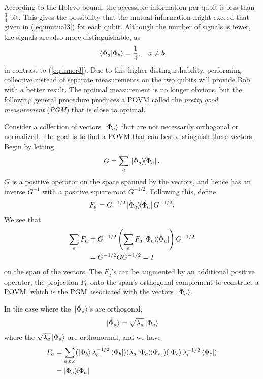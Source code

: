 \documentclass[a4paper, 12pt]{article}
\numberwithin{equation}{section}
\numberwithin{figure}{section}
\theoremstyle{definition}
\begin{document}
    According to the Holevo bound, the accessible information per qubit is less than $\frac{3}{4}$ bit. This gives the possibility that the mutual information might exceed that given in (\ref{eq:mutual3}) for each qubit. Although the number of signals is fewer, the signals are also more distinguishable, as
    \begin{align}
        \braket{\Phi_a}{\Phi_b} = \frac{1}{4}, \quad a \neq b
    \end{align}
    in contrast to (\ref{eq:inner3}). Due to this higher distinguishability, performing collective instead of separate measurements on the two qubits will provide Bob with a better result. The optimal measurement is no longer obvious, but the following general procedure produces a POVM called the \textit{pretty good measurement} (\textit{PGM}) that is close to optimal. \par
    Consider a collection of vectors $\ket*{\tilde{\Phi}_a}$ that are not necessarily orthogonal or normalized. The goal is to find a POVM that can best distinguish these vectors. Begin by letting 
    \begin{align}
        G = \sum_a \dyad*{\tilde{\Phi}_a}{\tilde{\Phi}_a}.
    \end{align}
    $G$ is a positive operator on the space spanned by the vectors, and hence has an inverse $G^{-1}$ with a positive square root $G^{-1/2}$. Following this, define
    \begin{align}
        F_a = G^{-1/2} \dyad*{\tilde{\Phi}_a}{\tilde{\Phi}_a} G^{-1/2}.
    \end{align}
    We see that
    \begin{align}
        \sum_a F_a &= G^{-1/2} \left( \sum_a F_a \dyad*{\tilde{\Phi}_a}{\tilde{\Phi}_a} \right) G^{-1/2} \\
        &= G^{-1/2} G G^{-1/2} = I
    \end{align}
    on the span of the vectors. The $F_a$'s can be augmented by an additional positive operator, the projection $F_0$ onto the span's orthogonal complement to construct a POVM, which is the PGM associated with the vectors $\ket*{\tilde{\Phi}_a}$. \par
    In the case where the $\ket*{\tilde{\Phi}_a}$'s are orthogonal,
    \begin{align}
        \ket*{\tilde{\Phi}_a} = \sqrt{\lambda_a} \ket{\Phi_a}
    \end{align}
    where the $\sqrt{\lambda_a} \ket{\Phi_a}$ are orthonormal, and we have
    \begin{align}
        F_a &= \sum_{a, b, c}(\ket{\Phi_b} \lambda_b^{-1/2} \bra{\Phi_b})(\lambda_a \dyad{\Phi_a}{\Phi_a})(\ket{\Phi_c} \lambda_c^{-1/2} \bra{\Phi_c}) \\
        &= \dyad{\Phi_a}{\Phi_a}
    \end{align}
\end{document}
